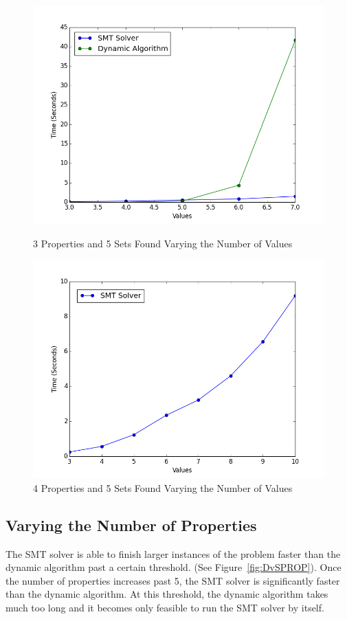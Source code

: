 \documentclass[pageno]{jpaper}
\begin{document}
\begin{figure}[htbb]
\begin{minipage}[b]{0.5\linewidth}
\centering
\includegraphics[width=.75\linewidth]{DvSVAL-v34567p3n5.png}
\caption{3 Properties and 5 Sets Found Varying the Number of Values}
\label{fig:DvSVAL}
\end{minipage}
\hspace{0.5cm}
\begin{minipage}[b]{0.5\linewidth}
\centering
\includegraphics[width=.75\linewidth]{SMTOnlyVAL-v345678910p4n5.png}
\caption{4 Properties and 5 Sets Found Varying the Number of Values}
\label{fig:SMTVal}
\end{minipage}
\end{figure}



\subsection{Varying the Number of Properties}

The SMT solver is able to finish larger instances of the problem faster than the dynamic algorithm past a certain threshold. (See Figure~\ref{fig:DvSPROP}). Once the number of properties increases past 5, the SMT solver is significantly faster than the dynamic algorithm. At this threshold, the dynamic algorithm takes much too long and it becomes only feasible to run the SMT solver by itself. 
\end{document}
